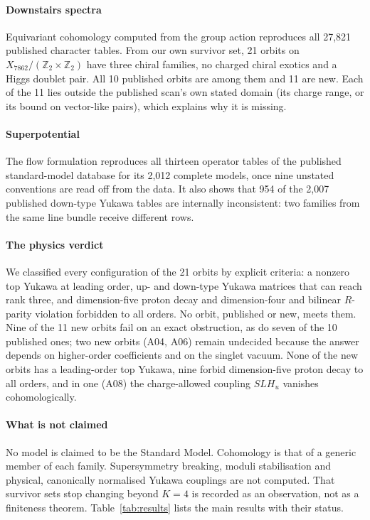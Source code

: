 \documentclass[10pt,a4paper]{article}
\newcommand{\Z}{\mathbb{Z}}
\newcommand{\Xa}{X_{7862}}
\begin{document}
\paragraph{Downstairs spectra} Equivariant cohomology computed from the group
action reproduces all 27,821 published character tables. From our own survivor
set, 21 orbits on $\Xa/(\Z_2\times\Z_2)$ have three chiral families, no charged
chiral exotics and a Higgs doublet pair. All 10 published orbits are among them
and 11 are new. Each of the 11 lies outside the published scan's own stated
domain (its charge range, or its bound on vector-like pairs), which explains
why it is missing.

\paragraph{Superpotential} The flow formulation reproduces all thirteen operator
tables of the published standard-model database for its 2,012 complete models,
once nine unstated conventions are read off from the data. It also shows that
954 of the 2,007 published down-type Yukawa tables are internally inconsistent:
two families from the same line bundle receive different rows.

\paragraph{The physics verdict} We classified every configuration of the 21
orbits by explicit criteria: a nonzero top Yukawa at leading order, up- and
down-type Yukawa matrices that can reach rank three, and dimension-five proton
decay and dimension-four and bilinear $R$-parity violation forbidden to all
orders. No
orbit, published or new, meets them. Nine of the 11 new orbits fail on an exact
obstruction, as do seven of the 10 published ones; two new orbits (A04, A06)
remain undecided because the answer depends on higher-order coefficients and on
the singlet vacuum. None of the new orbits has a leading-order top Yukawa, nine
forbid dimension-five proton decay to all orders, and in one (A08) the
charge-allowed coupling $SLH_u$ vanishes cohomologically.

\paragraph{What is not claimed} No model is claimed to be the Standard Model.
Cohomology is that of a generic member of each family. Supersymmetry breaking,
moduli stabilisation and physical, canonically normalised Yukawa couplings are
not computed. That survivor sets stop changing beyond $K=4$ is recorded as an
observation, not as a finiteness theorem. Table~\ref{tab:results} lists the
main results with their status.
\end{document}
